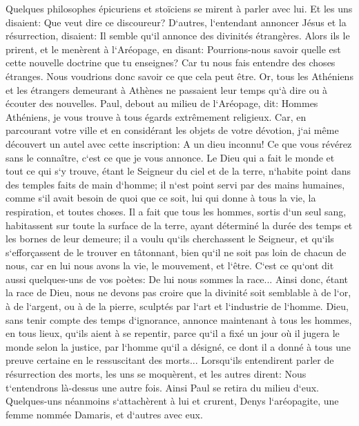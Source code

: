 \verse Quelques philosophes épicuriens et stoïciens se mirent à parler avec lui. Et les uns disaient: Que veut dire ce discoureur? D`autres, l`entendant annoncer Jésus et la résurrection, disaient: Il semble qu`il annonce des divinités étrangères. 
\verse Alors ils le prirent, et le menèrent à l`Aréopage, en disant: Pourrions-nous savoir quelle est cette nouvelle doctrine que tu enseignes? 
\verse Car tu nous fais entendre des choses étranges. Nous voudrions donc savoir ce que cela peut être. 
\verse Or, tous les Athéniens et les étrangers demeurant à Athènes ne passaient leur temps qu`à dire ou à écouter des nouvelles. 
\verse Paul, debout au milieu de l`Aréopage, dit: Hommes Athéniens, je vous trouve à tous égards extrêmement religieux. 
\verse Car, en parcourant votre ville et en considérant les objets de votre dévotion, j`ai même découvert un autel avec cette inscription: A un dieu inconnu! Ce que vous révérez sans le connaître, c`est ce que je vous annonce. 
\verse Le Dieu qui a fait le monde et tout ce qui s`y trouve, étant le Seigneur du ciel et de la terre, n`habite point dans des temples faits de main d`homme; 
\verse il n`est point servi par des mains humaines, comme s`il avait besoin de quoi que ce soit, lui qui donne à tous la vie, la respiration, et toutes choses. 
\verse Il a fait que tous les hommes, sortis d`un seul sang, habitassent sur toute la surface de la terre, ayant déterminé la durée des temps et les bornes de leur demeure; 
\verse il a voulu qu`ils cherchassent le Seigneur, et qu`ils s`efforçassent de le trouver en tâtonnant, bien qu`il ne soit pas loin de chacun de nous, 
\verse car en lui nous avons la vie, le mouvement, et l`être. C`est ce qu`ont dit aussi quelques-uns de vos poètes: De lui nous sommes la race... 
\verse Ainsi donc, étant la race de Dieu, nous ne devons pas croire que la divinité soit semblable à de l`or, à de l`argent, ou à de la pierre, sculptés par l`art et l`industrie de l`homme. 
\verse Dieu, sans tenir compte des temps d`ignorance, annonce maintenant à tous les hommes, en tous lieux, qu`ils aient à se repentir, 
\verse parce qu`il a fixé un jour où il jugera le monde selon la justice, par l`homme qu`il a désigné, ce dont il a donné à tous une preuve certaine en le ressuscitant des morts... 
\verse Lorsqu`ils entendirent parler de résurrection des morts, les uns se moquèrent, et les autres dirent: Nous t`entendrons là-dessus une autre fois. 
\verse Ainsi Paul se retira du milieu d`eux. 
\verse Quelques-uns néanmoins s`attachèrent à lui et crurent, Denys l`aréopagite, une femme nommée Damaris, et d`autres avec eux. 

